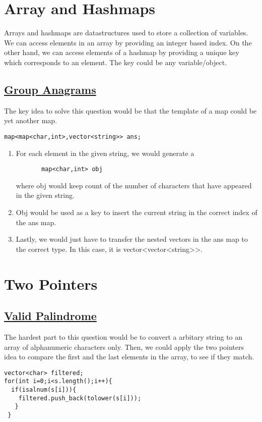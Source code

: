 \documentclass[11pt]{article}
\begin{document}
\section{Array and Hashmaps}
Arrays and hashmaps are datastructures used to store a collection of variables.
We can access elements in an array by providing an integer based index. On the other hand, we can access elements of a hashmap by providing a unique key which corresponds to an element. The key could be any variable/object.
\subsection{
 \href{https://leetcode.com/problems/group-anagrams/submissions/}{Group Anagrams}
}
The key  idea to solve this question would be that the template of a map could be yet another map.

\begin {lstlisting}
map<map<char,int>,vector<string>> ans;
\end{lstlisting}
\begin{enumerate}
 \item {
       
       For each element in the given string, we would generate a
       \begin {lstlisting}
       map<char,int> obj
       \end{lstlisting}
       where obj would keep count of the number of characters that have appeared in the given string.
       }
       
       \item{
                   Obj would be used as a key to insert the current string in the correct index of the ans map.
             }
 \item {
       Lastly, we would just have to transfer the nested vectors in the ans map to the correct type.
       In this case, it is vector<vector<string>>.
       }
\end{enumerate}

\section{Two Pointers}
\subsection{
 \href{https://leetcode.com/problems/valid-palindrome/submissions/}{Valid Palindrome}
}
The hardest part to this question would be to convert a arbitary string to an array of
alphanumeric characters only. Then, we could apply the two pointers idea to compare the first and the last elements in the array, to see if they match.
\begin{lstlisting}
vector<char> filtered;
for(int i=0;i<s.length();i++){
  if(isalnum(s[i])){
    filtered.push_back(tolower(s[i]));
   }
 }
\end{lstlisting}
\end{document}
